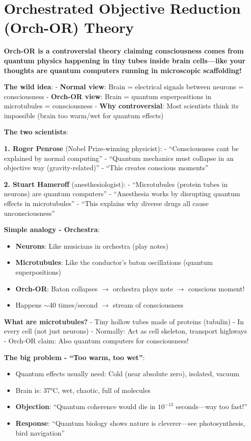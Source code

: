 \chapter{Orchestrated Objective Reduction (Orch-OR) Theory}
\label{ch:orch-or}

\begin{nontechnical}
\textbf{Orch-OR is a controversial theory claiming consciousness comes from quantum physics happening in tiny tubes inside brain cells---like your thoughts are quantum computers running in microscopic scaffolding!}

\textbf{The wild idea}: - \textbf{Normal view}: Brain = electrical
signals between neurons = consciousness - \textbf{Orch-OR view}: Brain =
quantum superpositions in microtubules = consciousness - \textbf{Why
controversial}: Most scientists think it\textquotesingle s impossible
(brain too warm/wet for quantum effects)

\textbf{The two scientists}:

\textbf{1. Roger Penrose} (Nobel Prize-winning physicist): -
``Consciousness can\textquotesingle t be explained by normal computing''
- ``Quantum mechanics must collapse in an objective way
(gravity-related)'' - ``This creates conscious moments''

\textbf{2. Stuart Hameroff} (anesthesiologist): - ``Microtubules
(protein tubes in neurons) are quantum computers'' - ``Anesthesia works
by disrupting quantum effects in microtubules'' - ``This explains why
diverse drugs all cause unconsciousness''

\textbf{Simple analogy - Orchestra}:
\begin{itemize}
\item \textbf{Neurons}: Like musicians in orchestra (play notes)
\item \textbf{Microtubules}: Like the conductor's baton oscillations (quantum superpositions)
\item \textbf{Orch-OR}: Baton collapses $\rightarrow$ orchestra plays note $\rightarrow$ conscious moment!
\item Happens $\sim$40 times/second $\rightarrow$ stream of consciousness
\end{itemize}

\textbf{What are microtubules?} - Tiny hollow tubes made of proteins
(tubulin) - In every cell (not just neurons) - Normally: Act as cell
skeleton, transport highways - Orch-OR claim: Also quantum computers for
consciousness!

\textbf{The big problem - ``Too warm, too wet''}:
\begin{itemize}
\item Quantum effects usually need: Cold (near absolute zero), isolated, vacuum
\item Brain is: 37°C, wet, chaotic, full of molecules
\item \textbf{Objection}: ``Quantum coherence would die in $10^{-13}$ seconds---way too fast!''
\item \textbf{Response}: ``Quantum biology shows nature is cleverer---see photosynthesis, bird navigation''
\end{itemize}


\end{nontechnical}
